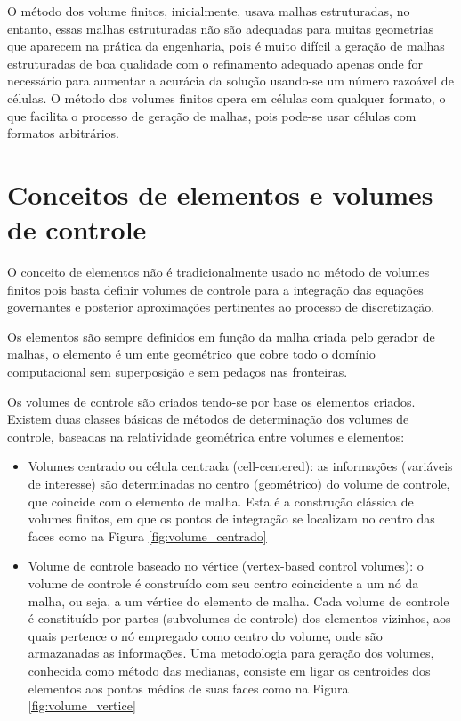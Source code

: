 O método dos volume finitos, inicialmente, usava malhas estruturadas, no entanto, essas malhas estruturadas não são adequadas para muitas geometrias que aparecem na prática da engenharia, pois é muito difícil a geração de malhas estruturadas de boa qualidade com o refinamento adequado apenas onde for necessário para aumentar a acurácia da solução usando-se um número razoável de células. O método dos volumes finitos opera em células com qualquer formato, o que facilita o processo de geração de malhas, pois pode-se usar células com formatos arbitrários. \cite{doi:10.1080/10407791003685155}

\section{Conceitos de elementos e volumes de controle}

O conceito de elementos não é tradicionalmente usado no método de volumes finitos pois basta definir volumes de controle para a integração das equações governantes e posterior aproximações pertinentes ao processo de discretização. \cite{Versteeg2007}

Os elementos são sempre definidos em função da malha criada pelo gerador de malhas, o elemento é um ente geométrico que cobre todo o domínio computacional sem superposição e sem pedaços nas fronteiras.

Os volumes de controle são criados tendo-se por base os elementos criados. Existem duas classes básicas de métodos de determinação dos volumes de controle, baseadas na relatividade geométrica entre volumes e elementos:

\begin{itemize}
    \item Volumes centrado ou célula centrada (cell-centered): as informações (variáveis de interesse) são determinadas no centro (geométrico) do volume de controle, que coincide com o elemento de malha. Esta é a construção clássica de volumes finitos, em que os pontos de integração se localizam no centro das faces como na Figura \ref{fig:volume_centrado}
    \item Volume de controle baseado no vértice (vertex-based control volumes): o volume de controle é construído com seu centro coincidente a um nó da malha, ou seja, a um vértice do elemento de malha. Cada volume de controle é constituído por partes (subvolumes de controle) dos elementos vizinhos, aos quais pertence o nó empregado como centro do volume, onde são armazanadas as informações. Uma metodologia para geração dos volumes, conhecida como método das medianas, consiste em ligar os centroides dos elementos aos pontos médios de suas faces como na Figura \ref{fig:volume_vertice}
\end{itemize}

